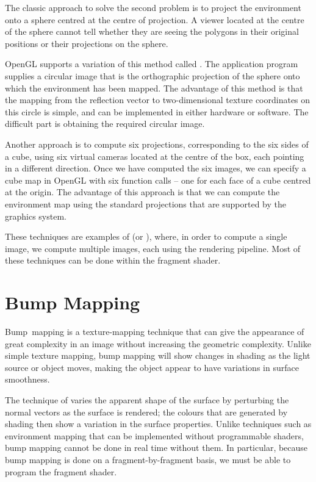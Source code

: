 \documentclass[../COS3712_Notes.tex]{subfiles}
\begin{document}
      The classic approach to solve the second problem is to project the environment
      onto a sphere centred at the centre of projection.
      A viewer located at the centre of the sphere cannot tell whether they are seeing the
      polygons in their original positions or their projections on the sphere.

      OpenGL supports a variation of this method called .
      The application program supplies a circular image that is the orthographic projection
      of the sphere onto which the environment has been mapped.
      The advantage of this method is that the mapping from the reflection vector to
      two-dimensional texture coordinates on this circle is simple, and can be implemented
      in either hardware or software.
      The difficult part is obtaining the required circular image.

      Another approach is to compute six projections, corresponding to the six sides of a cube,
      using six virtual cameras located at the centre of the box, each pointing in a different
      direction.
      Once we have computed the six images, we can specify a cube map in OpenGL with six function
      calls -- one for each face of a cube centred at the origin.
      The advantage of this approach is that we can compute the environment map using the
      standard projections that are supported by the graphics system.

      These techniques are examples of  (or ),
      where, in order to compute a single image, we compute multiple images, each using the
      rendering pipeline.
      Most of these techniques can be done within the fragment shader.

    \pagebreak

    \section{Bump Mapping}
      Bump~mapping is a texture-mapping technique that can give the appearance
      of great complexity in an image without increasing the geometric complexity.
      Unlike simple texture mapping, bump mapping will show changes in shading as the light
      source or object moves, making the object appear to have variations in
      surface smoothness.

      The technique of  varies the apparent shape of the surface
      by perturbing the normal vectors as the surface is rendered;
      the colours that are generated by shading then show a variation in the surface properties.
      Unlike techniques such as environment mapping that can be implemented without
      programmable shaders, bump mapping cannot be done in real time without them.
      In particular, because bump mapping is done on a fragment-by-fragment basis,
      we must be able to program the fragment shader.
\end{document}
